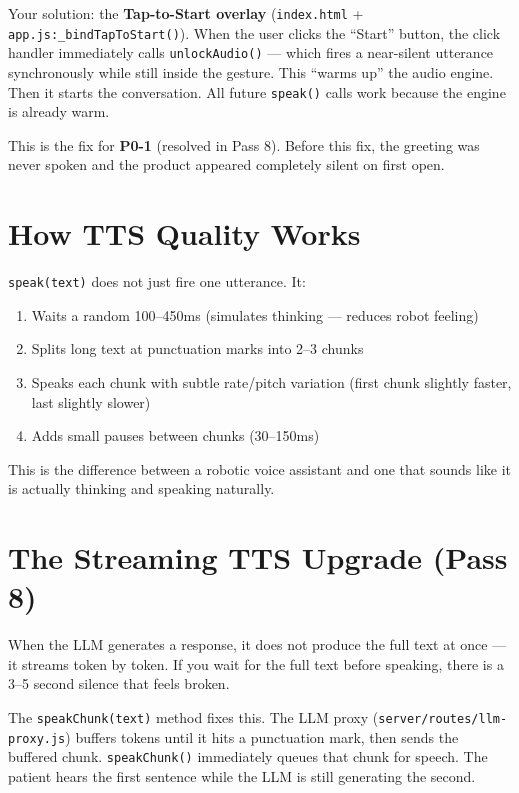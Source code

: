 \documentclass[12pt, a4paper]{report}
\newcommand{\ic}[1]{\texttt{\small\color{accentblue!70!black}#1}}
\begin{document}
Your solution: the \textbf{Tap-to-Start overlay} (\ic{index.html} +
\ic{app.js:\_bindTapToStart()}). When the user clicks the ``Start'' button, the click
handler immediately calls \ic{unlockAudio()} --- which fires a near-silent utterance
synchronously while still inside the gesture. This ``warms up'' the audio engine. Then
it starts the conversation. All future \ic{speak()} calls work because the engine is
already warm.

\begin{infobox}
  This is the fix for \textbf{P0-1} (resolved in Pass 8). Before this fix, the greeting
  was never spoken and the product appeared completely silent on first open.
\end{infobox}

\section{How TTS Quality Works}

\ic{speak(text)} does not just fire one utterance. It:

\begin{enumerate}
  \item Waits a random 100--450ms (simulates thinking --- reduces robot feeling)
  \item Splits long text at punctuation marks into 2--3 chunks
  \item Speaks each chunk with subtle rate/pitch variation (first chunk slightly faster,
        last slightly slower)
  \item Adds small pauses between chunks (30--150ms)
\end{enumerate}

This is the difference between a robotic voice assistant and one that sounds like it is
actually thinking and speaking naturally.

\section{The Streaming TTS Upgrade (Pass 8)}

When the LLM generates a response, it does not produce the full text at once --- it
streams token by token. If you wait for the full text before speaking, there is a 3--5
second silence that feels broken.

The \ic{speakChunk(text)} method fixes this. The LLM proxy
(\ic{server/routes/llm-proxy.js}) buffers tokens until it hits a punctuation mark, then
sends the buffered chunk. \ic{speakChunk()} immediately queues that chunk for speech.
The patient hears the first sentence while the LLM is still generating the second.
\end{document}
